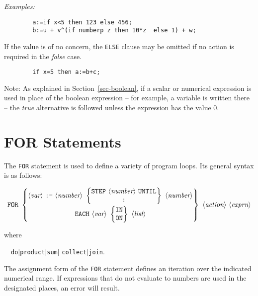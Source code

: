 \textit{Examples:}
\begin{verbatim}
        a:=if x<5 then 123 else 456;
        b:=u + v^(if numberp z then 10*z  else 1) + w;
\end{verbatim}
If the value is of no concern, the \texttt{ELSE} clause may be omitted if no
action is required in the \emph{false} case.
\begin{verbatim}
        if x=5 then a:=b+c;
\end{verbatim}
Note:  As explained in Section~\ref{sec-boolean},
if a scalar or numerical expression is used in place of
the boolean expression -- for example, a variable is written there -- the
\emph{true} alternative is followed unless the expression has the value 0.

\section{FOR Statements}
\hypertarget{command:FOR}{}
\hypertarget{command:FOREACH}{}
\hypertarget{reserved:IN}{}
\hypertarget{reserved:DO}{}
\hypertarget{reserved:SUM}{}
\hypertarget{reserved:PRODUCT}{}

The \texttt{FOR} statement
is used to define a variety of program
loops.  Its general syntax is as follows:
\begin{small}
  \[ \texttt{FOR}\ \left\{
  \begin{array}{@{}c@{}}
    \langle\textit{var}\rangle\ \texttt{:=}\ \langle\textit{number}\rangle\
    \left\{
    \begin{array}{@{}c@{}}
      \texttt{STEP}\ \langle\textit{number}\rangle\ \texttt{UNTIL} \\
      \texttt{:}
    \end{array}
    \right\}\
    \langle\textit{number}\rangle \\[3mm]
    \texttt{EACH}\ \langle\textit{var}\rangle\
    \left\{
    \begin{array}{@{}c@{}}
      \texttt{IN} \\ \texttt{ON}
    \end{array}
    \right\}\
    \langle\textit{list}\rangle
  \end{array}
  \right\}\ \langle\textit{action}\rangle\ \langle\textit{exprn}\rangle \]
\end{small}%
%
where
\begin{syntax}
  \ \BNFprod\ \texttt{do}|\texttt{product}|\texttt{sum}|%
                           \texttt{collect}|\texttt{join}.
\end{syntax}
The assignment form of the \texttt{FOR} statement defines an
iteration over the indicated numerical range.  If expressions that do not
evaluate to numbers are used in the designated places, an error will
result.

